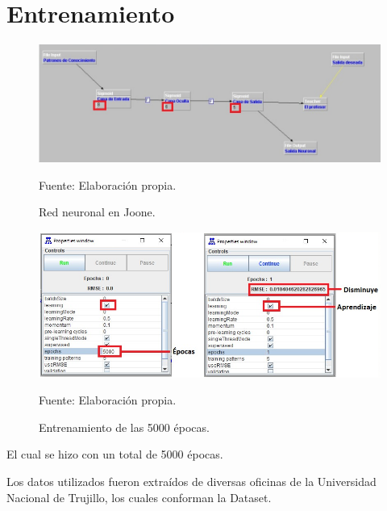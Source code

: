 \section{Entrenamiento}
\begin{figure}[h!]
	\centering
		\includegraphics[scale=0.6]{imagenes/redNeuroJoone.png}
		\caption{Red neuronal en Joone.}
	\begin{center}
    Fuente: Elaboración propia.
    \end{center}
	\label{fig:redNeuroJoone}
\end{figure}

\begin{figure}[h!]
	\centering
		\includegraphics[scale=0.8]{imagenes/redeopocas.png}
		\caption{Entrenamiento de las 5000 épocas.}
	\begin{center}
    Fuente: Elaboración propia.
    \end{center}
	\label{fig:redeopocas}
\end{figure}
El cual se hizo con un total de 5000 épocas.

Los datos utilizados fueron extraídos de diversas oficinas de la Universidad Nacional de Trujillo, los cuales conforman la Dataset.

